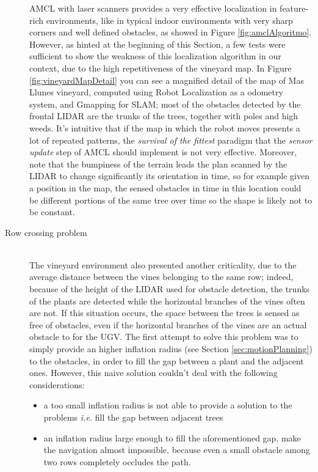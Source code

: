 \begin{description}
\ac{AMCL} with laser scanners provides a very effective localization in feature-rich environments, like in typical indoor environments with very sharp corners and well defined obstacles, as showed in Figure \ref{fig:amclAlgoritmo}.
However, as hinted at the beginning of this Section, a few tests were sufficient to show the weakness of this localization algorithm in our context, due to the high repetitiveness of the vineyard map. In Figure \ref{fig:vineyardMapDetail} you can see a magnified detail of the map of Mas Llunes vineyard, computed using Robot Localization as a odometry system, and Gmapping for \ac{SLAM}; most of the obstacles detected by the frontal \ac{LIDAR} are the trunks of the trees, together with poles and high weeds.
 It's intuitive that if the map in which the robot moves presents a lot of repeated patterns, the \textit{survival of the fittest} paradigm that the \textit{sensor update} step of \ac{AMCL} should implement is not very effective. Moreover, note that the bumpiness of the terrain leads the plan scanned by the \ac{LIDAR} to change significantly its orientation in time, so for example given a position in the map, the sensed obstacles in time in this location could be different portions of the same tree over time so the shape is likely not to be constant.

\item[Row crossing problem] \hfill \\
The vineyard environment also presented another criticality, due to the average distance between the vines belonging to the same row; indeed, because of the height of the \ac{LIDAR} used for obstacle detection, the trunks of the plants are detected while the horizontal branches of the vines often are not.
If this situation occurs, the space between the trees is sensed as free of obstacles, even if the horizontal branches of the vines are an actual obstacle to for the \ac{UGV}. The first attempt to solve this problem was to simply provide an higher inflation radius (see Section \ref{sec:motionPlanning}) to the obstacles, in order to fill the gap between a plant and the adjacent ones. However, this naive solution couldn't deal with the following considerations:
\begin{itemize}
	\item a too small inflation radius is not able to provide a solution to the problems \textit{i.e.} fill the gap between adjacent trees
	\item an inflation radius large enough to fill the aforementioned gap, make the navigation almost impossible, because even a small obstacle among two rows completely occludes the path.
\end{itemize}

\end{description}

